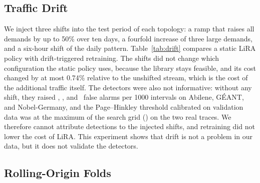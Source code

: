 \documentclass[journal]{IEEEtran}
\begin{document}
\begin{table}[t]
\centering
\caption{Per-Snapshot Optimization Baselines on a Test Subsample}
\label{tab:opt}
\footnotesize
\setlength{\tabcolsep}{4pt}

\end{table}

\begin{table}[t]
\centering
\caption{Scalability of the Optimization Step and the Safety Check}
\label{tab:scale}
\footnotesize
\setlength{\tabcolsep}{3pt}

\end{table}

\subsection{Traffic Drift}

We inject three shifts into the test period of each topology: a ramp that raises all demands by up to 50\% over ten days, a fourfold increase of three large demands, and a six-hour shift of the daily pattern. Table~\ref{tab:drift} compares a static LiRA policy with drift-triggered retraining. The shifts did not change which configuration the static policy uses, because the library stays feasible, and its cost changed by at most 0.74\% relative to the unshifted stream, which is the cost of the additional traffic itself. The detectors were also not informative: without any shift, they raised \driftFaAbi, \driftFaGea, and \driftFaNob\ false alarms per 1000 intervals on Abilene, G\'{E}ANT, and Nobel-Germany, and the Page--Hinkley threshold calibrated on validation data was at the maximum of the search grid (\driftThrAbi) on the two real traces. We therefore cannot attribute detections to the injected shifts, and retraining did not lower the cost of LiRA. This experiment shows that drift is not a problem in our data, but it does not validate the detectors.

\begin{table}[t]
\centering
\caption{Injected Traffic Shifts: Post-Shift Cost $J$ of Static and Drift-Triggered LiRA. FA/1k Is the Number of False Alarms per 1000 Intervals on the Stream Without a Shift}
\label{tab:drift}
\footnotesize
\setlength{\tabcolsep}{3pt}

\end{table}

\subsection{Rolling-Origin Folds}
\end{document}
